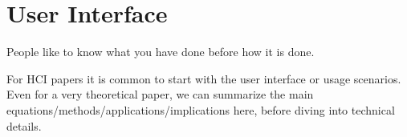 \section{User Interface}
\label{sec:interface}

People like to know what you have done before how it is done.

For HCI papers it is common to start with the user interface or usage scenarios.
Even for a very theoretical paper, we can summarize the main equations/methods/applications/implications here, before diving into technical details.

